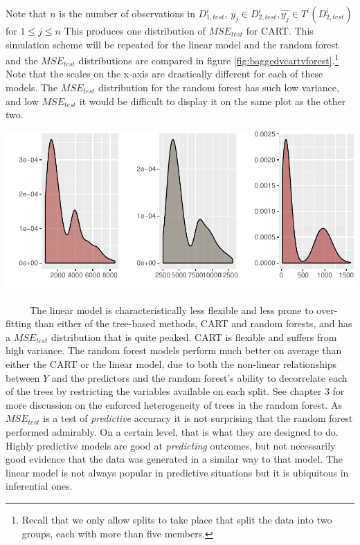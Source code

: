 \documentclass[12pt,twoside]{reedthesis}
\let\origfigure\figure
\let\endorigfigure\endfigure
\renewenvironment{figure}[1][2] {
    \expandafter\origfigure\expandafter[H]
} {
    \endorigfigure
}
\begin{document}
  Note that \(n\) is the number of observations in \(D_{1, test}^i\),
  \(y_j \in D_{2, test}^i, \hat{y_j} \in T^i(D_{2, test}^i)\) for
  \(1 \leq j \leq n\) This produces one distribution of \(MSE_{test}\) for
  CART. This simulation scheme will be repeated for the linear model and
  the random forest and the \(MSE_{test}\) distributions are compared in
  figure \ref{fig:baggedvcartvforest}.\footnote{Recall that we only allow
    splits to take place that split the data into two groups, each with
    more than five members.} Note that the scales on the x-axis are
  drastically different for each of these models. The \(MSE_{test}\)
  distribution for the random forest has such low variance, and low
  \(MSE_{test}\) it would be difficult to display it on the same plot as
  the other two.
  
  \begin{figure}[htbp]
  \centering
  \includegraphics{Thesis_files/figure-latex/unnamed-chunk-20-1.pdf}
  \caption{\label{fig:unnamed-chunk-20}\label{fig:baggedvcartvforest}The
  simulated MSE distributions of CART, linear model, and the random forest
  on D2}
  \end{figure}
  
  ~~~~~The linear model is characteristically less flexible and less prone
  to over-fitting than either of the tree-based methods, CART and random
  forests, and has a \(MSE_{test}\) distribution that is quite peaked.
  CART is flexible and suffers from high variance. The random forest
  models perform much better on average than either the CART or the linear
  model, due to both the non-linear relationships between \(Y\) and the
  predictors and the random forest's ability to decorrelate each of the
  trees by restricting the variables available on each split. See chapter
  3 for more discussion on the enforced heterogeneity of trees in the
  random forest. As \(MSE_{test}\) is a test of \emph{predictive} accuracy
  it is not surprising that the random forest performed admirably. On a
  certain level, that is what they are designed to do. Highly predictive
  models are good at \emph{predicting} outcomes, but not necessarily good
  evidence that the data was generated in a similar way to that model. The
  linear model is not always popular in predictive situations but it is
  ubiquitous in inferential ones.
  
\end{document}
